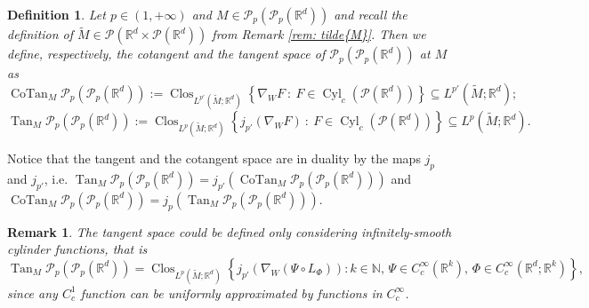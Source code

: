 \documentclass[10pt,leqno]{amsart}
\numberwithin{equation}{section}
\newtheorem{df}[teorema]{Definition}
\newtheorem{oss}[teorema]{Remark}
\newcommand{\R}{\mathbb{R}}
\newcommand{\PP}{\mathcal{P}}
\begin{document}

\begin{df}
    Let $p\in(1,+\infty)$ and $M\in \PP_p(\PP_p(\R^d))$ and recall the definition of $\widetilde{M}\in \PP(\R^d\times \PP(\R^d))$ from Remark \ref{rem: tilde{M}}. Then we define, respectively, the cotangent and the tangent space of $\PP_p(\PP_p(\R^d))$ at $M$ as
    \begin{equation}\label{eq: cotangent}
        \operatorname{CoTan}_M \PP_p(\PP_p(\R^d)) := \operatorname{Clos}_{L^{p'}(\widetilde{M};\R^d)} \left\{ \nabla_W F \ : \ F\in\operatorname{Cyl}_c(\PP(\R^d)) \right\} \subseteq L^{p'}(\widetilde{M};\R^d);
    \end{equation}
    \begin{equation}\label{eq: tangent}
        \operatorname{Tan}_M \PP_p(\PP_p(\R^d)) := \operatorname{Clos}_{L^{p}(\widetilde{M};\R^d)} \left\{ j_{p'}\left(\nabla_W F\right) \ : \ F\in\operatorname{Cyl}_c(\PP(\R^d)) \right\} \subseteq L^{p}(\widetilde{M};\R^d).
    \end{equation}
\end{df}
Notice that the tangent and the cotangent space are in duality by the maps $j_p$ and $j_{p'}$, i.e. $\operatorname{Tan}_M \PP_p(\PP_p(\R^d)) = j_{p'}(\operatorname{CoTan}_M \PP_p(\PP_p(\R^d)))$ and $\operatorname{CoTan}_M \PP_p(\PP_p(\R^d)) = j_p(\operatorname{Tan}_M \PP_p(\PP_p(\R^d)))$.

\begin{oss}
    The tangent space could be defined only considering infinitely-smooth cylinder functions, that is 
    \[\operatorname{Tan}_M \PP_p(\PP_p(\R^d)) = \operatorname{Clos}_{L^{p}(\widetilde{M};\R^d)} \left\{ j_{p'}\left(\nabla_W (\Psi\circ L_\Phi)\right)  :   k\in \mathbb{N}, \, \Psi\in C_c^\infty(\R^k), \, \Phi \in C_c^\infty(\R^d;\R^k) \right\},\]
    since any $C^1_c$ function can be uniformly approximated by functions in $C_c^\infty$. 
\end{oss}
\end{document}
